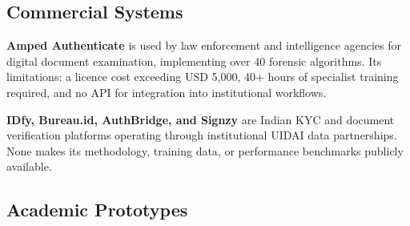 \documentclass[12pt,a4paper,oneside]{report}
\begin{document}
\subsection{Commercial Systems}

\textbf{Amped Authenticate} is used by law enforcement and intelligence agencies
for digital document examination, implementing over 40 forensic algorithms. Its
limitations: a licence cost exceeding USD 5,000, 40+ hours of specialist training
required, and no API for integration into institutional workflows.

\textbf{IDfy, Bureau.id, AuthBridge, and Signzy} are Indian KYC and document
verification platforms operating through institutional UIDAI data partnerships.
None makes its methodology, training data, or performance benchmarks publicly
available.

\subsection{Academic Prototypes}

\begin{table}[H]
\centering
\caption{Academic document fraud detection prototypes comparison.}
\label{tab:academic_summary}
\renewcommand{\arraystretch}{1.3}
\end{table}
\end{document}
